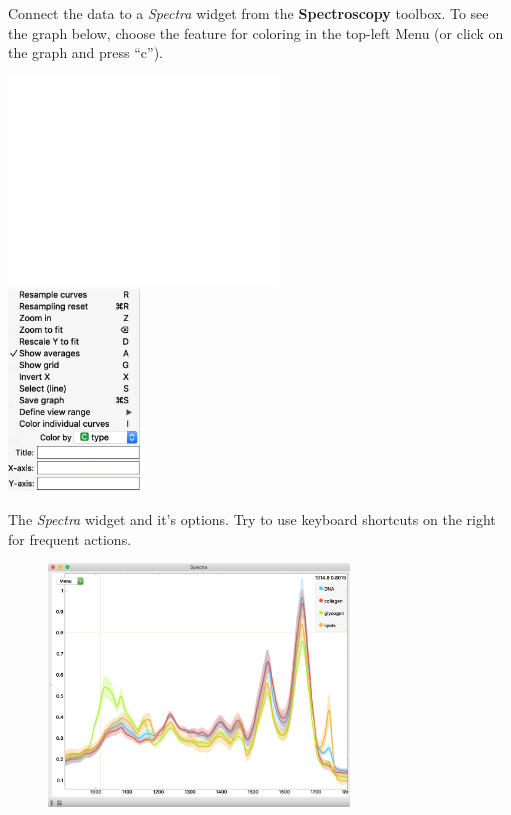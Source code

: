 Connect the data to a \textit{Spectra} widget from the \textbf{Spectroscopy} toolbox. To see the graph below, choose the feature for coloring in the top-left Menu (or click on the graph and press “c”).

\begin{marginfigure}
  \centering
  \includegraphics[height=55mm]{graphics/fig-spacer.png}\\
  \includegraphics[width=35mm]{graphics/ch-spectral_data/spectral-data-fig4.png}%
  ~\vspace{0.5 cm}
  \caption{The \textit{Spectra} widget and it's options. Try to use keyboard shortcuts on the right for frequent actions.}
  \label{fig:spectral-data-fig4}
\end{marginfigure}

\begin{figure}[h]
  \centering
  \includegraphics[width=80mm]{graphics/ch-spectral_data/spectral-data-fig3.png}%

  \label{fig:spectral-data-fig3}
\end{figure}
